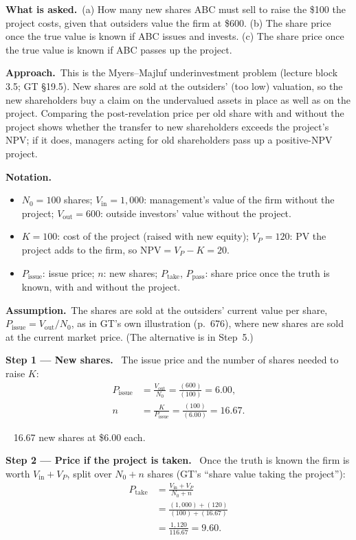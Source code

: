 \documentclass[11pt,a4paper]{article}
\newcommand{\notation}{\par\noindent\textbf{Notation.}}
\newcommand{\step}[2]{\par\medskip\noindent\textbf{Step #1 --- #2.}~}
\newcommand{\assume}{\par\smallskip\noindent\textbf{Assumption.}~}
\newcommand{\asked}{\par\medskip\noindent\textbf{What is asked.}~}
\newcommand{\approach}{\par\smallskip\noindent\textbf{Approach.}~}
\newcommand{\answer}[1]{\par\smallskip\noindent\fbox{\textbf{Answer #1.}}~}
\begin{document}
\asked (a) How many new shares ABC must sell to raise the \$100 the project costs, given that outsiders value the firm at \$600. (b) The share price once the true value is known if ABC issues and invests. (c) The share price once the true value is known if ABC passes up the project.

\approach This is the Myers--Majluf underinvestment problem (lecture block 3.5; GT \S19.5). New shares are sold at the outsiders' (too low) valuation, so the new shareholders buy a claim on the undervalued assets in place as well as on the project. Comparing the post-revelation price per old share with and without the project shows whether the transfer to new shareholders exceeds the project's NPV; if it does, managers acting for old shareholders pass up a positive-NPV project.

\notation
\begin{itemize}
  \item $N_0=100$ shares; $V_{\text{in}}=1{,}000$: management's value of the firm without the project; $V_{\text{out}}=600$: outside investors' value without the project.
  \item $K=100$: cost of the project (raised with new equity); $V_P=120$: PV the project adds to the firm, so $\text{NPV}=V_P-K=20$.
  \item $P_{\text{issue}}$: issue price; $n$: new shares; $P_{\text{take}}$, $P_{\text{pass}}$: share price once the truth is known, with and without the project.
\end{itemize}

\assume The shares are sold at the outsiders' current value per share, $P_{\text{issue}}=V_{\text{out}}/N_0$, as in GT's own illustration (p.~676), where new shares are sold at the current market price. (The alternative is in Step~5.)

\step{1}{New shares} The issue price and the number of shares needed to raise $K$:
\begin{align}
  P_{\text{issue}} &= \frac{V_{\text{out}}}{N_0} = \frac{(600)}{(100)} = 6.00, \label{t3e4-Pi}\\
  n &= \frac{K}{P_{\text{issue}}} = \frac{(100)}{(6.00)} = 16.67. \label{t3e4-n}
\end{align}

\answer{(a)} 16.67 new shares at \$6.00 each.

\step{2}{Price if the project is taken} Once the truth is known the firm is worth $V_{\text{in}}+V_P$, split over $N_0+n$ shares (GT's ``share value taking the project''):
\begin{align}
  P_{\text{take}} &= \frac{V_{\text{in}}+V_P}{N_0+n} \label{t3e4-take}\\
                  &= \frac{(1{,}000)+(120)}{(100)+(16.67)} \nonumber\\
                  &= \frac{1{,}120}{116.67} = 9.60. \nonumber
\end{align}
\end{document}
